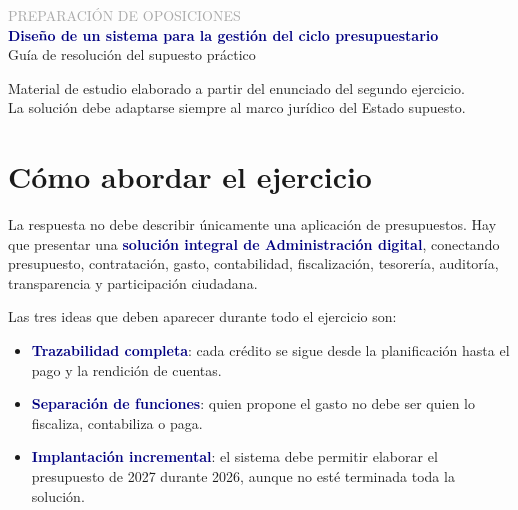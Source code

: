 \documentclass[11pt,a4paper]{article}
\newcommand{\key}[1]{\textbf{\textcolor{navy}{#1}}}
\begin{document}
\begin{titlepage}
\centering
\vspace*{2cm}
{\Large\textcolor{darkgray}{PREPARACIÓN DE OPOSICIONES}}\\[1.2cm]
{\Huge\bfseries\textcolor{navy}{Diseño de un sistema para la gestión del ciclo presupuestario}}\\[1cm]
{\Large Guía de resolución del supuesto práctico}\\[2cm]
\vfill
\begin{minipage}{0.82\textwidth}
\small\centering
Material de estudio elaborado a partir del enunciado del segundo ejercicio.\\
La solución debe adaptarse siempre al marco jurídico del Estado supuesto.
\end{minipage}
\vspace{1cm}
\end{titlepage}

\tableofcontents
\newpage

\section{Cómo abordar el ejercicio}

La respuesta no debe describir únicamente una aplicación de presupuestos. Hay que presentar una \key{solución integral de Administración digital}, conectando presupuesto, contratación, gasto, contabilidad, fiscalización, tesorería, auditoría, transparencia y participación ciudadana.

Las tres ideas que deben aparecer durante todo el ejercicio son:
\begin{itemize}
\item \key{Trazabilidad completa}: cada crédito se sigue desde la planificación hasta el pago y la rendición de cuentas.
\item \key{Separación de funciones}: quien propone el gasto no debe ser quien lo fiscaliza, contabiliza o paga.
\item \key{Implantación incremental}: el sistema debe permitir elaborar el presupuesto de 2027 durante 2026, aunque no esté terminada toda la solución.
\end{itemize}
\end{document}
